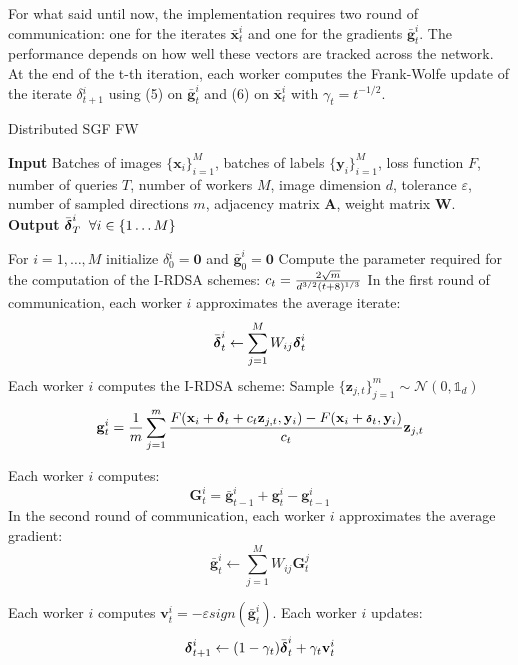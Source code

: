 \indent For what said until now, the implementation requires two round of communication: one for the iterates $\bar{\mathbf{x}}_t^i$ and one for the gradients $\bar{\mathbf{g}}_t^i$. The performance depends on how well these vectors are tracked across the network.\\
\indent At the end of the t-th iteration, each worker computes the Frank-Wolfe update of the iterate \mbox{\boldmath$ \delta$}$_{t+1}^i$ using (5) on $\bar{\mathbf{g}}_t^i$ and (6) on $\bar{\mathbf{x}}_t^i$ with $\gamma_t = t^{-1/2}$.\\
\begin{algorithm}
	\caption{Distributed SGF FW}\label{distributed}
	\textbf{Input} Batches of images $\{\mathbf{x}_i\}_{i=1}^M$, batches of labels $\{\mathbf{y}_i\}_{i=1}^M$, loss function $F$, number of queries $T$, number of workers $M$, image dimension $d$, tolerance $\varepsilon$, number of sampled directions $m$, adjacency matrix $\mathbf{A}$, weight matrix $\mathbf{W}$.\\
	\textbf{Output} $\bar{\mbox{\boldmath$ \delta$}}_T^i\;\;\forall i \in \{1\dots M\}$
	\begin{algorithmic}[1]		
		\State For $i=1,\dots, M$ initialize \mbox{\boldmath$ \delta$}$_0^i =\mathbf{0} $ and $\bar{\mathbf{g}}_0^i = \mathbf{0}$
		\State Compute the parameter required for the computation of the I-RDSA schemes: 
		${\scriptsize c_t =\frac{2\sqrt{m}}{d^{3/2}(t+8)^{1/3}}}$
		\State In the first round of communication, each worker $i$ approximates the average iterate: \newline
		\[\bar{\mbox{\boldmath$ \delta$}}_t^i \leftarrow \sum_{j=1}^{M} W_{ij}\mbox{\boldmath$ \delta$}_t^i\]
		\State Each worker $i$ computes the I-RDSA scheme:\newline 
		Sample $\{\mathbf{z}_{j,t}\}_{j=1}^m \sim\mathcal{N}(0,\mathbb{1}_d)$ \newline
		\[\mathbf{g}_t^i = \frac{1}{m} \sum_{j=1}^{m} \frac{F(\mathbf{x}_i + \mbox{\boldmath$ \delta$}_t + c_t\mathbf{z}_{j,t}, \mathbf{y}_i) - F(\mathbf{x}_i + \mbox{\scriptsize\boldmath$ \delta$}_t, \mathbf{y}_i)}{c_t}\mathbf{z}_{j,t}\]
		
		\State  Each worker $i$ computes:
		\[ \mathbf{G}_t^i = \bar{\mathbf{g}}_{t-1}^i + \mathbf{g}_t^i - \mathbf{g}_{t-1}^i \]
		\State In the second round of communication, each worker $i$ approximates the average gradient:
		\[ \bar{\mathbf{g}}_t^i \leftarrow \sum_{j=1}^{M} W_{ij}\mathbf{G}_t^j  \]
		
		\State Each worker $i$ computes $\mathbf{v}_t^i = - \varepsilon sign(\bar{\mathbf{g}}^i_t)$.
		\State Each worker $i$ updates:
		\[\mbox{\boldmath$ \delta$}_{t+1}^i \leftarrow (1-\gamma_t)\bar{\mbox{\boldmath$ \delta$}}_t^i + \gamma_t\mathbf{v}_t^i\]
		\EndFor
		
	\end{algorithmic}
\end{algorithm}